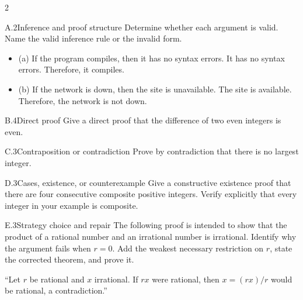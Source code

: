 \documentclass[9pt]{extarticle}
\begin{document}
\begin{multicols}{2}
\begin{CoreProblem}{A.2}{Inference and proof structure}
Determine whether each argument is valid. Name the valid inference rule or the invalid form.
\begin{itemize}
  \item (a) If the program compiles, then it has no syntax errors. It has no syntax errors. Therefore, it compiles.
  \item (b) If the network is down, then the site is unavailable. The site is
        available. Therefore, the network is not down.
\end{itemize}
\end{CoreProblem}
\begin{CoreProblem}{B.4}{Direct proof}
Give a direct proof that the difference of two even integers is even.
\end{CoreProblem}
\begin{CoreProblem}{C.3}{Contraposition or contradiction}
Prove by contradiction that there is no largest integer.
\end{CoreProblem}
\columnbreak
\begin{CoreProblem}{D.3}{Cases, existence, or counterexample}
Give a constructive existence proof that there are four consecutive composite
positive integers. Verify explicitly that every integer in your example is
composite.
\end{CoreProblem}
\begin{CoreProblem}{E.3}{Strategy choice and repair}
The following proof is intended to show that the product of a rational number
and an irrational number is irrational. Identify why the argument fails when
$r=0$. Add the weakest necessary restriction on $r$, state the corrected
theorem, and prove it.

``Let $r$ be rational and $x$ irrational. If $rx$ were rational, then $x=(rx)/r$ would be rational, a contradiction.''
\end{CoreProblem}
\end{multicols}
\CoreWorkArea
\FormBreak
{}
\end{document}
